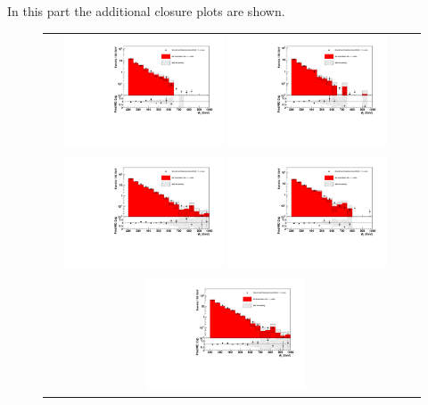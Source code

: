 In this part the additional closure plots are shown.


\begin{figure}[tbhn]
\begin{center}
\begin{tabular}{cc}
\includegraphics[width=0.45\textwidth]{lostlepton/plots/closure/MHTwIsoMu.pdf} 
\includegraphics[width=0.45\textwidth]{lostlepton/plots/closure/MHTwIsoE.pdf} \\
\includegraphics[width=0.45\textwidth]{lostlepton/plots/closure/MHTwRecoMu.pdf}
\includegraphics[width=0.45\textwidth]{lostlepton/plots/closure/MHTwRecoE.pdf}\\
\includegraphics[width=0.45\textwidth]{lostlepton/plots/closure/MHTwAccMu.pdf}

\end{tabular}
\end{center}
\end{figure}
